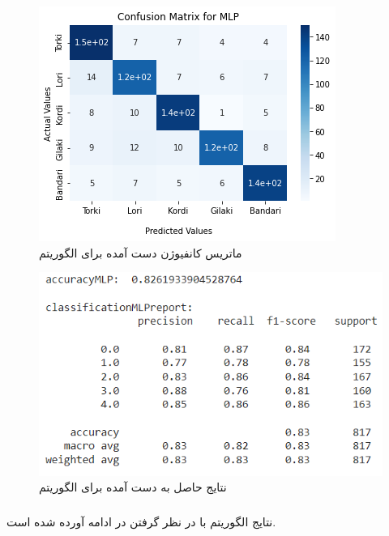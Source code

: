 \begin{figure}[h!]
	\centering
	\includegraphics[width=0.75\linewidth]{images/mlp_cm_augment.png}
	\caption{ماتریس کانفیوژن دست آمده برای الگوریتم }
	\label{fig:mlp_cm_augment}
\end{figure}

\begin{figure}[h!]
	\centering
	\includegraphics[width=0.9\linewidth]{images/mlp_classification_results_augment.PNG}
	\caption{نتایج حاصل به دست آمده برای الگوریتم }
	\label{fig:mlp_classification_results_augment}
\end{figure}
\newpage
\subsubsection{}
نتایج الگوریتم  با در نظر گرفتن  در ادامه آورده شده است.

